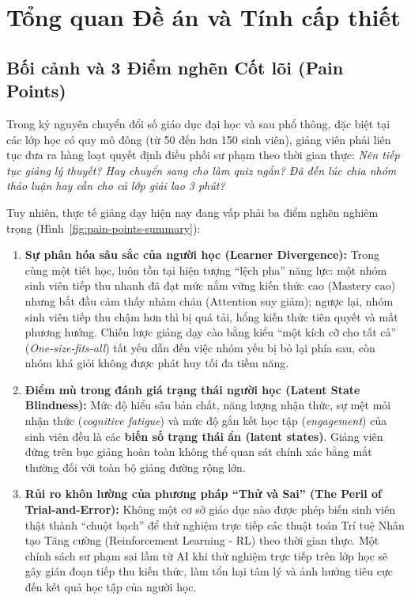 \section{Tổng quan Đề án và Tính cấp thiết}\label{sec:tong-quan}

\subsection{Bối cảnh và 3 Điểm nghẽn Cốt lõi (Pain Points)}\label{subsec:pain-points}
Trong kỷ nguyên chuyển đổi số giáo dục đại học và sau phổ thông, đặc biệt tại các lớp học có quy mô đông (từ 50 đến hơn 150 sinh viên), giảng viên phải liên tục đưa ra hàng loạt quyết định điều phối sư phạm theo thời gian thực: \textit{Nên tiếp tục giảng lý thuyết? Hay chuyển sang cho làm quiz ngắn? Đã đến lúc chia nhóm thảo luận hay cần cho cả lớp giải lao 3 phút?}

Tuy nhiên, thực tế giảng dạy hiện nay đang vấp phải ba điểm nghẽn nghiêm trọng (Hình~\ref{fig:pain-points-summary}):

\begin{enumerate}[label=\textbf{\arabic*.}]
  \item \textbf{Sự phân hóa sâu sắc của người học (Learner Divergence):} Trong cùng một tiết học, luôn tồn tại hiện tượng ``lệch pha'' năng lực: một nhóm sinh viên tiếp thu nhanh đã đạt mức nắm vững kiến thức cao ($\text{Mastery}$ cao) nhưng bắt đầu cảm thấy nhàm chán ($\text{Attention}$ suy giảm); ngược lại, nhóm sinh viên tiếp thu chậm hơn thì bị quá tải, hổng kiến thức tiên quyết và mất phương hướng. Chiến lược giảng dạy cào bằng kiểu ``một kích cỡ cho tất cả'' (\textit{One-size-fits-all}) tất yếu dẫn đến việc nhóm yếu bị bỏ lại phía sau, còn nhóm khá giỏi không được phát huy tối đa tiềm năng.
  
  \item \textbf{Điểm mù trong đánh giá trạng thái người học (Latent State Blindness):} Mức độ hiểu sâu bản chất, năng lượng nhận thức, sự mệt mỏi nhận thức (\textit{cognitive fatigue}) và mức độ gắn kết học tập (\textit{engagement}) của sinh viên đều là các \textbf{biến số trạng thái ẩn (latent states)}. Giảng viên đứng trên bục giảng hoàn toàn không thể quan sát chính xác bằng mắt thường đối với toàn bộ giảng đường rộng lớn.
  
  \item \textbf{Rủi ro khôn lường của phương pháp ``Thử và Sai'' (The Peril of Trial-and-Error):} Không một cơ sở giáo dục nào được phép biến sinh viên thật thành ``chuột bạch'' để thử nghiệm trực tiếp các thuật toán Trí tuệ Nhân tạo Tăng cường (Reinforcement Learning - RL) theo thời gian thực. Một chính sách sư phạm sai lầm từ AI khi thử nghiệm trực tiếp trên lớp học sẽ gây gián đoạn tiếp thu kiến thức, làm tổn hại tâm lý và ảnh hưởng tiêu cực đến kết quả học tập của người học.
\end{enumerate}

